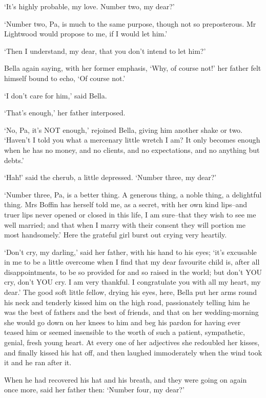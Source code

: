‘It’s highly probable, my love. Number two, my dear?’

‘Number two, Pa, is much to the same purpose, though not so
preposterous. Mr Lightwood would propose to me, if I would let him.’

‘Then I understand, my dear, that you don’t intend to let him?’

Bella again saying, with her former emphasis, ‘Why, of course not!’ her
father felt himself bound to echo, ‘Of course not.’

‘I don’t care for him,’ said Bella.

‘That’s enough,’ her father interposed.

‘No, Pa, it’s NOT enough,’ rejoined Bella, giving him another shake or
two. ‘Haven’t I told you what a mercenary little wretch I am? It
only becomes enough when he has no money, and no clients, and no
expectations, and no anything but debts.’

‘Hah!’ said the cherub, a little depressed. ‘Number three, my dear?’

‘Number three, Pa, is a better thing. A generous thing, a noble thing, a
delightful thing. Mrs Boffin has herself told me, as a secret, with her
own kind lips--and truer lips never opened or closed in this life, I am
sure--that they wish to see me well married; and that when I marry with
their consent they will portion me most handsomely.’ Here the grateful
girl burst out crying very heartily.

‘Don’t cry, my darling,’ said her father, with his hand to his eyes;
‘it’s excusable in me to be a little overcome when I find that my dear
favourite child is, after all disappointments, to be so provided for
and so raised in the world; but don’t YOU cry, don’t YOU cry. I am very
thankful. I congratulate you with all my heart, my dear.’ The good soft
little fellow, drying his eyes, here, Bella put her arms round his neck
and tenderly kissed him on the high road, passionately telling him
he was the best of fathers and the best of friends, and that on her
wedding-morning she would go down on her knees to him and beg his pardon
for having ever teased him or seemed insensible to the worth of such
a patient, sympathetic, genial, fresh young heart. At every one of her
adjectives she redoubled her kisses, and finally kissed his hat off, and
then laughed immoderately when the wind took it and he ran after it.

When he had recovered his hat and his breath, and they were going on
again once more, said her father then: ‘Number four, my dear?’

